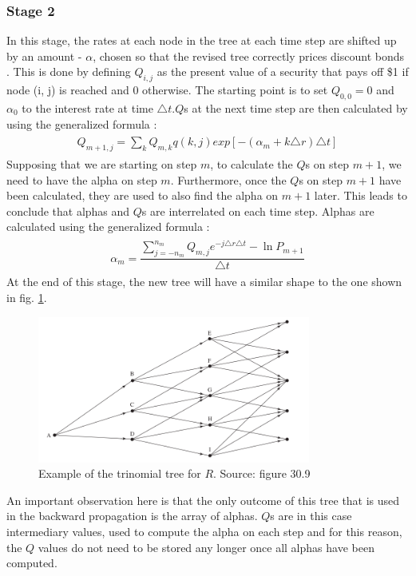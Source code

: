 \subsubsection*{Stage 2}
In this stage, the rates at each node in the tree at each time step are shifted up by an amount - $\alpha$, chosen so that the revised tree correctly prices discount bonds \cite[pg. 6]{uhwirt}. This is done by defining $Q_{i,j}$ as the present value of a security that pays off \$1 if node (i, j) is reached and 0 otherwise. The starting point is to set $Q_{0,0}=0$ and $\alpha_0$ to the interest rate at time $\triangle t$.$Q$s at the next time step are then calculated by using the generalized formula \cite[pg.705]{ofod}:  
\begin{equation}
\begin{gathered}
\begin{aligned}
Q_{m+1, j} = \sum_k Q_{m,k}q(k,j)exp[-(\alpha_m+k\triangle r)\triangle t]
\nonumber
\end{aligned}
\end{gathered}
\end{equation}
Supposing that we are starting on step $m$, to calculate the $Q$s on step $m+1$, we need to have the alpha on step $m$. Furthermore, once the $Q$s on step $m+1$ have been calculated, they are used to also find the alpha on $m+1$ later. This leads to conclude that alphas and $Q$s are interrelated on each time step. Alphas are calculated using the generalized formula \cite[pg.703]{ofod}:
\begin{equation}
\begin{gathered}
\begin{aligned}
\alpha_{m} = \dfrac{\sum_{j=-n_m}^{n_m} Q_{m,j}e^{-j\triangle r\triangle t} - \ln{P_{m + 1}}}{\triangle t}
\nonumber
\end{aligned}
\end{gathered}
\end{equation}
At the end of this stage, the new tree will have a similar shape to the one shown in fig. \ref{fig:treeconststage2}. 
\begin{figure}[H]
	\centering
	\includegraphics[width=0.8\textwidth]{img/treeconststage2.png}
	\caption{Example of the trinomial tree for $R$. Source: figure 30.9 \cite[pg. 702]{ofod}}
	\label{fig:treeconststage2}
\end{figure}
An important observation here is that the only outcome of this tree that is used in the backward propagation is the array of alphas. $Q$s are in this case intermediary values, used to compute the alpha on each step and for this reason, the $Q$ values do not need to be stored any longer once all alphas have been computed. 
